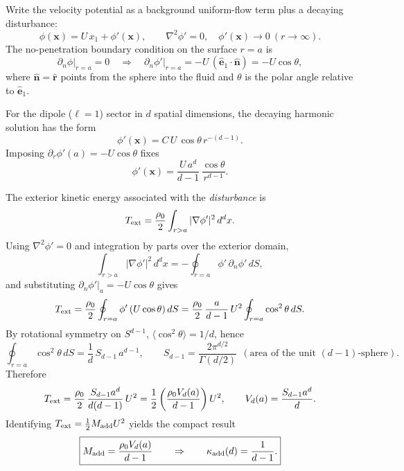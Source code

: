 \documentclass[11pt]{article}
\begin{document}
Write the velocity potential as a background uniform-flow term plus a decaying disturbance:
\begin{equation}
  \phi(\mathbf x) = U\,x_1 + \phi'(\mathbf x),
  \qquad
  \nabla^2 \phi' = 0,\quad \phi'(\mathbf x)\to 0\ (r\to\infty).
\end{equation}
The no-penetration boundary condition on the surface \(r=a\) is
\begin{equation}
  \partial_n \phi \big|_{r=a} = 0
  \quad\Longrightarrow\quad
  \partial_n \phi' \big|_{r=a} = -U\,(\hat{\mathbf e}_1\cdot \hat{\mathbf n})
  = -U\cos\theta,
\end{equation}
where \(\hat{\mathbf n}=\hat{\mathbf r}\) points from the sphere into the fluid and \(\theta\) is the polar angle relative to \(\hat{\mathbf e}_1\).

For the dipole (\(\ell=1\)) sector in \(d\) spatial dimensions, the decaying harmonic solution has the form
\begin{equation}
  \phi'(\mathbf x) = C\,U\,\cos\theta\,r^{-(d-1)}.
\end{equation}
Imposing \(\partial_r \phi'(a) = -U\cos\theta\) fixes
\begin{equation}
  \phi'(\mathbf x) =
  \frac{U\,a^d}{d-1}\,\frac{\cos\theta}{r^{d-1}}.
\end{equation}

The exterior kinetic energy associated with the \emph{disturbance} is
\begin{equation}
  T_{\rm ext} = \frac{\rho_0}{2}\int_{r>a} |\nabla\phi'|^2\,d^d x.
\end{equation}
Using \(\nabla^2\phi'=0\) and integration by parts over the exterior domain,
\begin{equation}
  \int_{r>a} |\nabla\phi'|^2\,d^d x
  = -\oint_{r=a} \phi'\,\partial_n \phi'\,dS,
\end{equation}
and substituting \(\partial_n\phi'|_{a}=-U\cos\theta\) gives
\begin{equation}
  T_{\rm ext}
  = \frac{\rho_0}{2}\oint_{r=a} \phi'\,(U\cos\theta)\,dS
  = \frac{\rho_0}{2}\,\frac{a}{d-1}\,U^2 \oint_{r=a} \cos^2\theta\,dS.
\end{equation}
By rotational symmetry on \(S^{d-1}\), \(\langle \cos^2\theta\rangle = 1/d\), hence
\begin{equation}
  \oint_{r=a} \cos^2\theta\,dS
  = \frac{1}{d}\,S_{d-1}\,a^{d-1},
  \qquad
  S_{d-1}=\frac{2\pi^{d/2}}{\Gamma(d/2)}
  \ \ (\text{area of the unit }(d-1)\text{-sphere}).
\end{equation}
Therefore
\begin{equation}
  T_{\rm ext}
  = \frac{\rho_0}{2}\,\frac{S_{d-1}a^d}{d(d-1)}\,U^2
  = \frac{1}{2}\left(\frac{\rho_0 V_d(a)}{d-1}\right)U^2,
  \qquad
  V_d(a)=\frac{S_{d-1}a^d}{d}.
\end{equation}
Identifying \(T_{\rm ext}=\tfrac{1}{2}M_{\rm add}U^2\) yields the compact result
\begin{equation}
  \boxed{
  M_{\rm add} = \frac{\rho_0 V_d(a)}{d-1}
  \qquad\Rightarrow\qquad
  \kappa_{\rm add}(d)=\frac{1}{d-1}.
  }
\end{equation}
\end{document}
